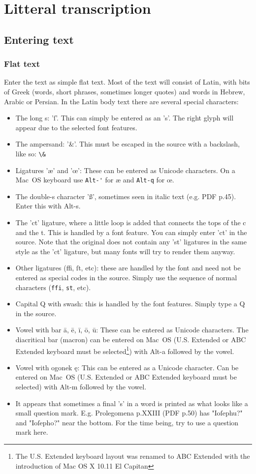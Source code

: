 \documentclass{report}
\begin{document}
\chapter{Litteral transcription}
\section{Entering text}
\subsection{Flat text}
Enter the text as simple flat text.
Most of the text will consist of Latin,
with bits of Greek (words, short phrases, sometimes longer quotes) and words
in Hebrew, Arabic or Persian.
In the Latin body text there are several special characters:
\begin{itemize}
\item The long s: 'ſ'. This can simply be entered as an 's'. The right glyph
will appear due to the selected font features.
\item The ampersand: '\&'. This must be escaped in the source with a backslash,
like so: \verb;\&;
\item Ligatures 'æ' and 'œ': These can be entered as Unicode characters.
On a Mac~OS keyboard use \verb;Alt-'; for æ and \verb;Alt-q; for œ.
\item The double-s character 'ß', sometimes seen in italic text (e.g. PDF p.45).
Enter this with Alt-s.
\item The 'ct' ligature, where a little loop is added that connects the tops
of the c and the t.
This is handled by a font feature.
You can simply enter 'ct' in the source.
Note that the original does not contain any 'st' ligatures in the same style
as the 'ct' ligature, but many fonts will try to render them anyway.
\item Other ligatures (ffi, ſt, etc): these are handled by the font and need
not be entered as special codes in the source.
Simply use the sequence of normal characters (\verb;ffi;, \verb;st;, etc).
\item  Capital Q with swash: this is handled by the font features.
Simply type a Q in the source.
\item Vowel with bar ā, ē, ī, ō, ū: These can be entered as Unicode characters.
The diacritical bar (macron) can be entered on Mac~OS (U.S. Extended or
ABC Extended keyboard must be
selected\footnote{The U.S. Extended keyboard layout was renamed to
ABC Extended with the introduction of Mac OS X 10.11 El Capitan})
with Alt-a followed by the vowel.
\item Vowel with ogonek ę: This can be entered as a Unicode character.
Can be entered on Mac~OS (U.S. Extended or ABC Extended keyboard must be
selected\footnotemark[\value{footnote}]) with Alt-m followed by the vowel.
\item It appears that sometimes a final 's' in a word is printed as what looks like a small question mark. E.g. Prolegomena p.XXIII (PDF p.50) has "Ioſephu?" and "Ioſepho?" near the bottom. For the time being, try to use a question mark here.
\end{itemize}
\end{document}

